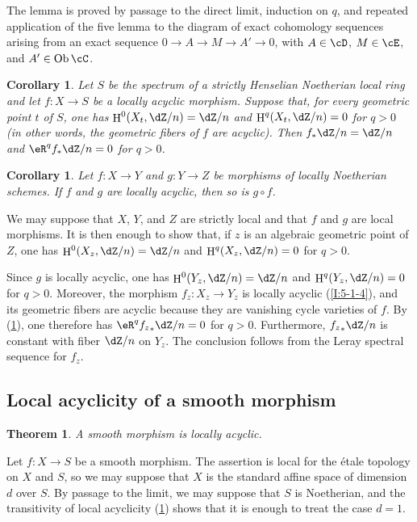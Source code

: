\documentclass[12pt,oneside,english]{smfbook}
\DeclareMathOperator{\h}{H}
\DeclareMathOperator{\ob}{Ob}
\newtheorem{corollary}[subsubsection]{Corollary}
\newtheorem{theorem}[subsubsection]{Theorem}
\begin{document}
The lemma is proved by passage to the direct limit, induction on $q$, and repeated application of the five lemma to the diagram of exact cohomology sequences arising from an exact sequence $0\to A\to M\to A'\to0$, with $A\in\cD$, $M\in\cE$, and $A'\in\ob\cC$.

\begin{corollary}\label{I:5-1-9}
Let $S$ be the spectrum of a strictly Henselian Noetherian local ring and let $f:X\to S$ be a locally acyclic morphism. Suppose that, for every geometric point $t$ of $S$, one has $\h^0(X_t,\dZ/n)=\dZ/n$ and $\h^q(X_t,\dZ/n)=0$ for $q>0$ (in other words, the geometric fibers of $f$ are acyclic). Then $f_*\dZ/n=\dZ/n$ and $\eR^qf_*\dZ/n=0$ for $q>0$.
\end{corollary}

\begin{corollary}\label{I:5-1-10}
Let $f:X\to Y$ and $g:Y\to Z$ be morphisms of locally Noetherian schemes. If $f$ and $g$ are locally acyclic, then so is $g\circ f$.
\end{corollary}

We may suppose that $X$, $Y$, and $Z$ are strictly local and that $f$ and $g$ are local morphisms. It is then enough to show that, if $z$ is an algebraic geometric point of $Z$, one has $\h^0(X_z,\dZ/n)=\dZ/n$ and $\h^q(X_z,\dZ/n)=0$ for $q>0$.

Since $g$ is locally acyclic, one has $\h^0(Y_z,\dZ/n)=\dZ/n$ and $\h^q(Y_z,\dZ/n)=0$ for $q>0$. Moreover, the morphism $f_z:X_z\to Y_z$ is locally acyclic (\ref{I:5-1-4}), and its geometric fibers are acyclic because they are vanishing cycle varieties of $f$. By (\ref{I:5-1-9}), one therefore has $\eR^q{f_z}_*\dZ/n=0$ for $q>0$. Furthermore, ${f_z}_*\dZ/n$ is constant with fiber $\dZ/n$ on $Y_z$. The conclusion follows from the Leray spectral sequence for $f_z$.

\subsection{Local acyclicity of a smooth morphism}\label{I:5-2}

\begin{theorem}\label{I:5-2-1}
A smooth morphism is locally acyclic.
\end{theorem}

Let $f:X\to S$ be a smooth morphism. The assertion is local for the étale topology on $X$ and $S$, so we may suppose that $X$ is the standard affine space of dimension $d$ over $S$. By passage to the limit, we may suppose that $S$ is Noetherian, and the transitivity of local acyclicity (\ref{I:5-1-10}) shows that it is enough to treat the case $d=1$.
\end{document}
